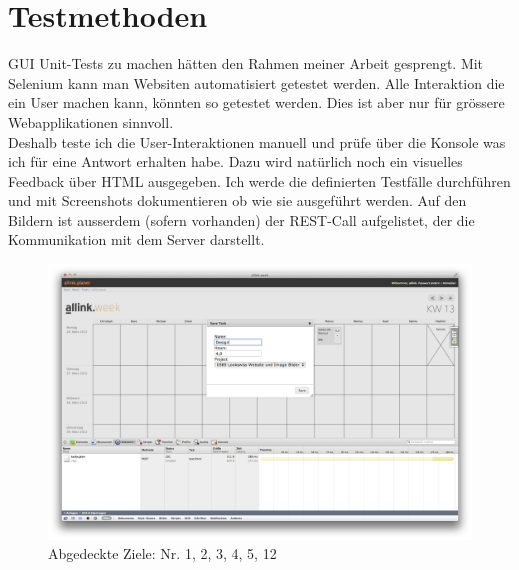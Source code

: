 \section{Testmethoden}
GUI Unit-Tests zu machen hätten den Rahmen meiner Arbeit gesprengt.
Mit Selenium kann man Websiten automatisiert getestet werden. Alle Interaktion die ein User machen kann, könnten so getestet werden.
Dies ist aber nur für grössere Webapplikationen sinnvoll.\\
Deshalb teste ich die User-Interaktionen manuell und prüfe über die Konsole was ich für eine Antwort erhalten habe. Dazu wird natürlich noch ein visuelles Feedback über HTML ausgegeben.
Ich werde die definierten Testfälle durchführen und mit Screenshots dokumentieren ob wie sie ausgeführt werden.
Auf den Bildern ist ausserdem (sofern vorhanden) der REST-Call aufgelistet, der die Kommunikation mit dem Server darstellt.
\clearpage
\begin{figure}[htbp]
    \centering
        \includegraphics[height=0.85\textwidth,angle=90]{bilder/testing/Task_erstellen.png}
    \caption{Abgedeckte Ziele: Nr. 1, 2, 3, 4, 5, 12}
    \label{fig:bilder_testing_Task erstellen}
\end{figure}
